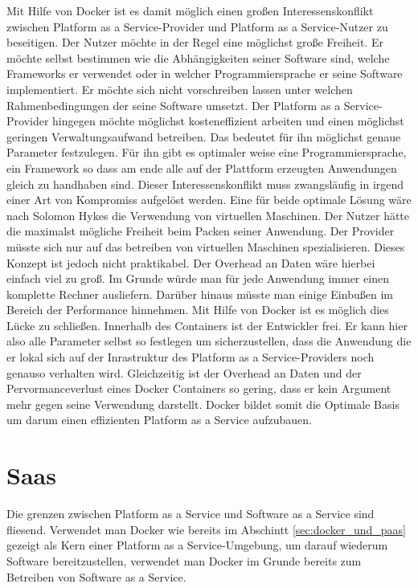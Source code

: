 Mit Hilfe von Docker ist es damit möglich einen großen Interessenskonflikt zwischen Platform as a Service-Provider und Platform as a Service-Nutzer zu beseitigen.
Der Nutzer möchte in der Regel eine möglichst große Freiheit. Er möchte selbst bestimmen wie die Abhängigkeiten seiner Software sind, welche Frameworks er verwendet oder in welcher Programmiersprache er seine Software implementiert. Er möchte sich nicht vorschreiben lassen unter welchen Rahmenbedingungen der seine Software umsetzt. Der Platform as a Service-Provider hingegen möchte möglichst kosteneffizient arbeiten und einen möglichst geringen Verwaltungsaufwand betreiben. Das bedeutet für ihn möglichst genaue Parameter festzulegen. Für ihn gibt es optimaler weise eine Programmiersprache, ein Framework so dass am ende alle auf der Plattform erzeugten Anwendungen gleich zu handhaben sind. Dieser Interessenskonflikt muss zwangsläufig in irgend einer Art von Kompromiss aufgelöst werden.
Eine für beide optimale Lösung wäre nach Solomon Hykes \cite[Zeit 13:50]{hykes_introduction_2013} die Verwendung von virtuellen Maschinen. Der Nutzer hätte die maximalst mögliche Freiheit beim Packen seiner Anwendung. Der Provider müsste sich nur auf das betreiben von virtuellen Maschinen spezialisieren. Dieses Konzept ist jedoch nicht praktikabel. Der Overhead an Daten wäre hierbei einfach viel zu groß. Im Grunde würde man für jede Anwendung immer einen komplette Rechner ausliefern. Darüber hinaus müsste man einige Einbußen im Bereich der Performance hinnehmen.
Mit Hilfe von Docker ist es möglich dies Lücke zu schließen. Innerhalb des Containers ist der Entwickler frei. Er kann hier also alle Parameter selbst so festlegen um sicherzustellen, dass die Anwendung die er lokal sich auf der Inrastruktur des Platform as a Service-Providers noch genauso verhalten wird. Gleichzeitig ist der Overhead an Daten und der Pervormanceverlust eines Docker Containers so gering, dass er kein Argument mehr gegen seine Verwendung darstellt.
Docker bildet somit die Optimale Basis um darum einen effizienten Platform as a Service aufzubauen. 

\section{Saas}
\label{sec:saas}
Die grenzen zwischen Platform as a Service und Software as a Service sind fliesend.
Verwendet man Docker wie bereits im Abschintt \ref{sec:docker_und_paas} gezeigt als Kern einer Platform as a Service-Umgebung, um darauf wiederum Software bereitzustellen, verwendet man Docker im Grunde bereits zum Betreiben von Software as a Service.

